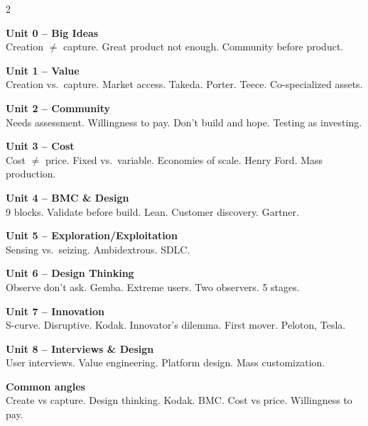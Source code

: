 \documentclass[8pt,landscape,a4paper]{article}
\begin{document}
\newpage
\vspace*{0.3em}
\noindent\color{noteblue}
\setlength{\parskip}{0.3em}
\begin{multicols}{2}

\textbf{Unit 0 -- Big Ideas}\\
Creation $\neq$ capture. Great product not enough. Community before product.

\textbf{Unit 1 -- Value}\\
Creation vs.\ capture. Market access. Takeda. Porter. Teece. Co-specialized assets.

\textbf{Unit 2 -- Community}\\
Needs assessment. Willingness to pay. Don't build and hope. Testing as investing.

\textbf{Unit 3 -- Cost}\\
Cost $\neq$ price. Fixed vs.\ variable. Economies of scale. Henry Ford. Mass production.

\textbf{Unit 4 -- BMC \& Design}\\
9 blocks. Validate before build. Lean. Customer discovery. Gartner.

\textbf{Unit 5 -- Exploration/Exploitation}\\
Sensing vs.\ seizing. Ambidextrous. SDLC.

\textbf{Unit 6 -- Design Thinking}\\
Observe don't ask. Gemba. Extreme users. Two observers. 5 stages.

\textbf{Unit 7 -- Innovation}\\
S-curve. Disruptive. Kodak. Innovator's dilemma. First mover. Peloton, Tesla.

\textbf{Unit 8 -- Interviews \& Design}\\
User interviews. Value engineering. Platform design. Mass customization.

\textbf{Common angles}\\
Create vs capture. Design thinking. Kodak. BMC. Cost vs price. Willingness to pay.

\end{multicols}
\vfill
\normalsize\normalfont\color{black}
\end{document}
